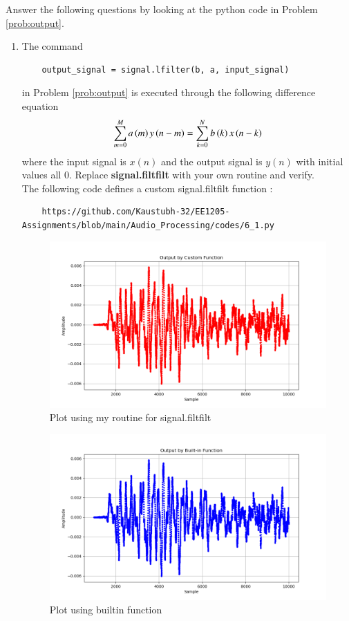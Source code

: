 \documentclass[journal,12pt,twocolumn]{IEEEtran}
\theoremstyle{remark}
\begin{document}
Answer the following questions by looking at the python code in Problem \ref{prob:output}.
\begin{enumerate}[label=\thesection.\arabic*]
\item
The command
\begin{lstlisting}
	output_signal = signal.lfilter(b, a, input_signal)
	\end{lstlisting}
in Problem \ref{prob:output} is executed through the following difference equation
\begin{equation}
\label{eq:iir_filter_gen}
 \sum _{m=0}^{M}a\left(m\right)y\left(n-m\right)=\sum _{k=0}^{N}b\left(k\right)x\left(n-k\right)
\end{equation}
%
where the input signal is $x(n)$ and the output signal is $y(n)$ with initial values all 0. Replace
\textbf{signal.filtfilt} with your own routine and verify.
%
\solution\\
The following code defines a custom signal.filtfilt function :
\begin{lstlisting}
    https://github.com/Kaustubh-32/EE1205-Assignments/blob/main/Audio_Processing/codes/6_1.py
\end{lstlisting}
\begin{figure}[!ht]
\centering
\includegraphics[width=\columnwidth]{output_custom.png}
\caption{Plot using my routine for signal.filtfilt}
\label{fig:ff1}
\end{figure}
\begin{figure}[!ht]
\centering
\includegraphics[width=\columnwidth]{output_builtin.png}
\caption{Plot using builtin function}
\label{fig:ff2}
\end{figure}




\end{enumerate}
\end{document}
